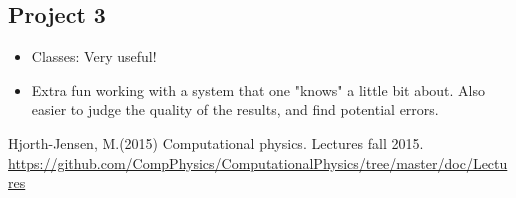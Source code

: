 \documentclass{article}
\begin{document}
\subsection{Project 3}
\begin{itemize}
	\item  Classes: Very useful!
	
	\item Extra fun working with a system that one "knows" a little bit about. Also easier to judge the quality of the results, and find potential errors.
\end{itemize}













\pagebreak
\begin{thebibliography}{9}
	Hjorth-Jensen, M.(2015)
	Computational physics. Lectures fall 2015. 
	\url{https://github.com/CompPhysics/ComputationalPhysics/tree/master/doc/Lectures}
	

	


\end{thebibliography}
\end{document}
